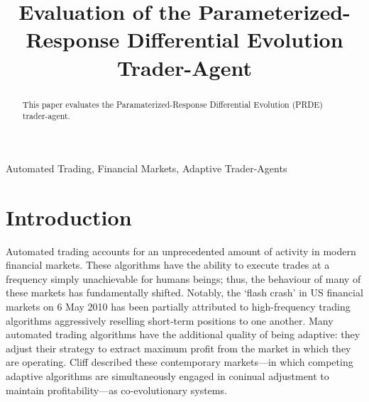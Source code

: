 \documentclass[conference]{IEEEtran}
\begin{document}
\title{Evaluation of the Parameterized-Response Differential Evolution Trader-Agent}

\author{
}

\maketitle

\begin{abstract}
This paper evaluates the Paramaterized-Response Differential Evolution (PRDE) trader-agent.
\end{abstract}

\begin{IEEEkeywords}
Automated Trading, Financial Markets, Adaptive Trader-Agents
\end{IEEEkeywords}

\section{Introduction}

Automated trading accounts for an unprecedented amount of activity in modern financial markets.
These algorithms have the ability to execute trades at a frequency simply unachievable for humans beings; thus, the behaviour of many of these markets has fundamentally shifted.
Notably, the `flash crash' in US financial markets on 6 May 2010 has been partially attributed to high-frequency trading algorithms aggressively reselling short-term positions to one another.
Many automated trading algorithms have the additional quality of being adaptive: they adjust their strategy to extract maximum profit from the market in which they are operating.
Cliff \cite{PRDE} described these contemporary markets---in which competing adaptive algorithms are simultaneously engaged in coninual adjustment to maintain profitability---as co-evolutionary systems.
\end{document}
